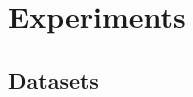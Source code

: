 \documentclass{article}
\begin{document}









\section{Experiments}

\subsection{Datasets}
\end{document}
